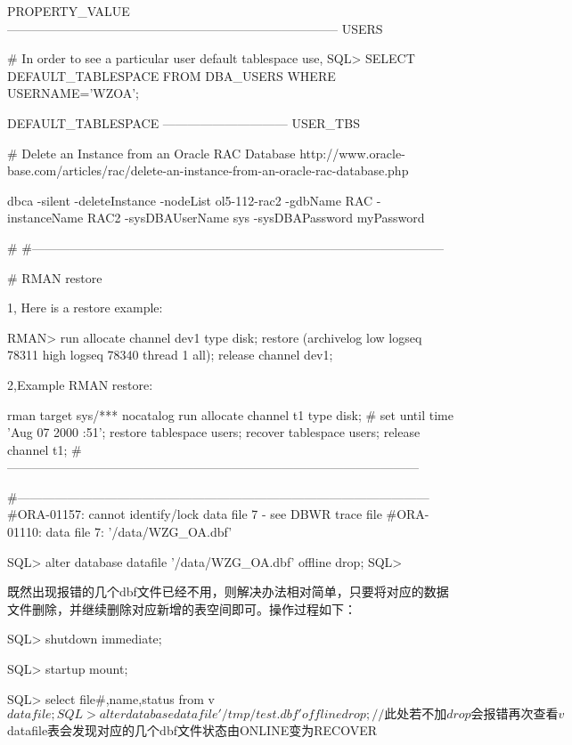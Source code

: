 \begin{table}
PROPERTY_VALUE
--------------------------------------------------------------------------------
USERS

# In order to see a particular user default tablespace use,
SQL> SELECT DEFAULT_TABLESPACE FROM DBA_USERS WHERE USERNAME='WZOA';

DEFAULT_TABLESPACE
------------------------------
USER_TBS

# Delete an Instance from an Oracle RAC Database
http://www.oracle-base.com/articles/rac/delete-an-instance-from-an-oracle-rac-database.php

dbca -silent -deleteInstance -nodeList ol5-112-rac2 -gdbName RAC -instanceName RAC2 -sysDBAUserName sys -sysDBAPassword myPassword


#
#---------------------------------------------------------------------------------------------------

# RMAN restore 

1, Here is a restore example:

RMAN> run {
 allocate channel dev1 type disk;
 restore (archivelog low logseq 78311 high logseq 78340 thread 1 all);
 release channel dev1;
}

2,Example RMAN restore:

rman target sys/*** nocatalog 
run {
  allocate channel t1 type disk;
  # set until time 'Aug 07 2000 :51';
  restore tablespace users; 
  recover tablespace users; 
  release channel t1; 
}
#---------------------------------------------------------------------------------------------------

#---------------------------------------------------------------------------------------------------
#ORA-01157: cannot identify/lock data file 7 - see DBWR trace file
#ORA-01110: data file 7: '/data/WZG_OA.dbf'

SQL> alter database datafile '/data/WZG_OA.dbf' offline drop;
SQL> 

 既然出现报错的几个dbf文件已经不用，则解决办法相对简单，只要将对应的数据文件删除，并继续删除对应新增的表空间即可。操作过程如下：

 SQL> shutdown immediate;

 SQL> startup mount;

 SQL> select file#,name,status from v$datafile;

 SQL> alter database datafile '/tmp/test.dbf' offline drop;      //此处若不加drop会报错

 再次查看v$datafile表会发现对应的几个dbf文件状态由ONLINE变为RECOVER


\end{table}
